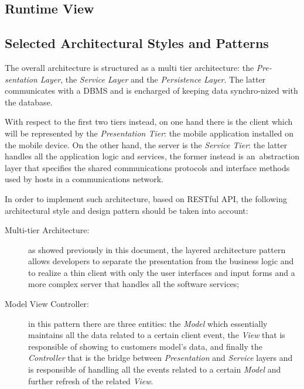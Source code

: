 \documentclass[a4paper]{article}
\begin{document}
\newpage
\subsection{Runtime View}

\newpage
\subsection{Selected Architectural Styles and Patterns}
    The overall architecture is structured as a multi tier architecture: the \textit{Pre-\newline sentation Layer}, the \textit{Service Layer} and the \textit{Persistence Layer}. The latter communicates with a DBMS and is encharged of keeping data synchro-\newline nized with the database.
    
    With respect to the first two tiers instead, on one hand there is the client which will be represented by the \textit{Presentation Tier}: the mobile application installed on the mobile device. On the other hand, the server is the \textit{Service Tier}: the latter handles all the application logic and services, the former instead is an abstraction layer that specifies the shared communications protocols and interface methods used by hosts in a communications network.
    
    In order to implement such architecture, based on RESTful API, the following architectural style and design pattern should be taken into account:
    \begin{description}
        \item[Multi-tier Architecture:] as showed previously in this document, the layered architecture pattern allows developers to separate the presentation from the business logic and to realize a thin client with only the user interfaces and input forms and a more complex server that handles all the software services;
        \item[Model View Controller:] in this pattern there are three entities: the \textit{Model} which essentially maintains all the data related to a certain client event, the \textit{View} that is responsible of showing to customers model's data, and finally the \textit{Controller} that is the bridge between \textit{Presentation} and \textit{Service} layers and is responsible of handling all the events related to a certain \textit{Model} and further refresh of the related \textit{View}.
    \end{description}
\end{document}
